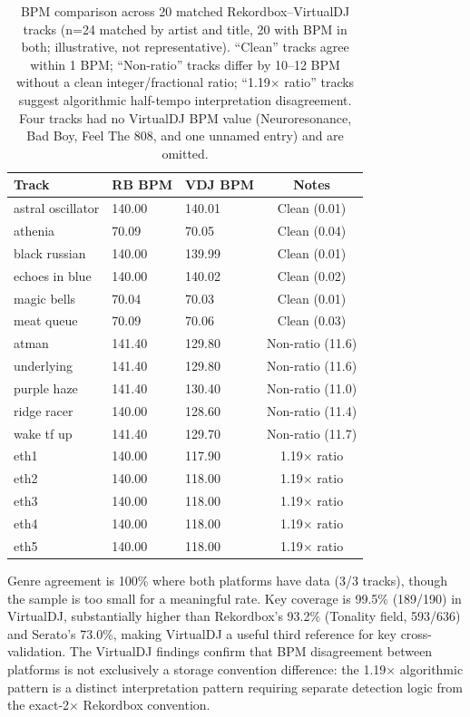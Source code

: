 \documentclass[letterpaper,10pt]{article}
\begin{document}
\begin{table}[t]
  \centering
  \small
  \begin{tabular}{lllc}
    \toprule
    \textbf{Track} & \textbf{RB BPM} & \textbf{VDJ BPM} & \textbf{Notes} \\
    \midrule
    astral oscillator & 140.00 & 140.01 & Clean (0.01) \\
    athenia & 70.09 & 70.05 & Clean (0.04) \\
    black russian & 140.00 & 139.99 & Clean (0.01) \\
    echoes in blue & 140.00 & 140.02 & Clean (0.02) \\
    magic bells & 70.04 & 70.03 & Clean (0.01) \\
    meat queue & 70.09 & 70.06 & Clean (0.03) \\
    \midrule
    atman & 141.40 & 129.80 & Non-ratio (11.6) \\
    underlying & 141.40 & 129.80 & Non-ratio (11.6) \\
    purple haze & 141.40 & 130.40 & Non-ratio (11.0) \\
    ridge racer & 140.00 & 128.60 & Non-ratio (11.4) \\
    wake tf up & 141.40 & 129.70 & Non-ratio (11.7) \\
    \midrule
    eth1 & 140.00 & 117.90 & 1.19$\times$ ratio \\
    eth2 & 140.00 & 118.00 & 1.19$\times$ ratio \\
    eth3 & 140.00 & 118.00 & 1.19$\times$ ratio \\
    eth4 & 140.00 & 118.00 & 1.19$\times$ ratio \\
    eth5 & 140.00 & 118.00 & 1.19$\times$ ratio \\
    \bottomrule
  \end{tabular}
  \caption{BPM comparison across 20 matched Rekordbox--VirtualDJ tracks (n=24 matched by artist and title, 20 with BPM in both; illustrative, not representative). ``Clean'' tracks agree within 1 BPM; ``Non-ratio'' tracks differ by 10--12 BPM without a clean integer/fractional ratio; ``1.19$\times$ ratio'' tracks suggest algorithmic half-tempo interpretation disagreement. Four tracks had no VirtualDJ BPM value (Neuroresonance, Bad Boy, Feel The 808, and one unnamed entry) and are omitted.}
  \label{tab:vdj-rb}
\end{table}

Genre agreement is 100\% where both platforms have data (3/3 tracks), though the sample is too small for a meaningful rate. Key coverage is 99.5\% (189/190) in VirtualDJ, substantially higher than Rekordbox's 93.2\% (Tonality field, 593/636) and Serato's 73.0\%, making VirtualDJ a useful third reference for key cross-validation. The VirtualDJ findings confirm that BPM disagreement between platforms is not exclusively a storage convention difference: the 1.19$\times$ algorithmic pattern is a distinct interpretation pattern requiring separate detection logic from the exact-2$\times$ Rekordbox convention.
\end{document}
